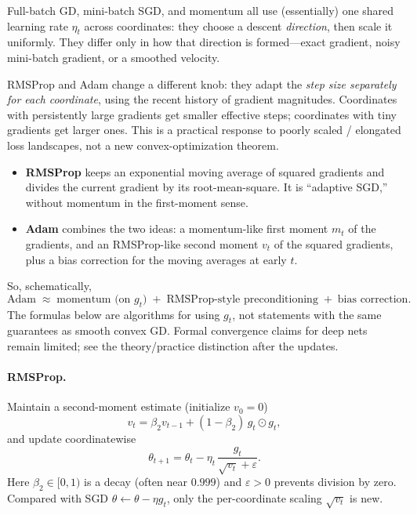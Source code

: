 \documentclass[11pt,a4paper]{article}
\theoremstyle{definition}
\begin{document}
\begin{note}
Full-batch GD, mini-batch SGD, and momentum all use (essentially) one shared learning rate $\eta_t$ across coordinates: they choose a descent \emph{direction}, then scale it uniformly. They differ only in how that direction is formed---exact gradient, noisy mini-batch gradient, or a smoothed velocity.

RMSProp and Adam change a different knob: they adapt the \emph{step size separately for each coordinate}, using the recent history of gradient magnitudes. Coordinates with persistently large gradients get smaller effective steps; coordinates with tiny gradients get larger ones. This is a practical response to poorly scaled / elongated loss landscapes, not a new convex-optimization theorem.

\begin{itemize}
  \item \textbf{RMSProp} keeps an exponential moving average of squared gradients and divides the current gradient by its root-mean-square. It is ``adaptive SGD,'' without momentum in the first-moment sense.
  \item \textbf{Adam} combines the two ideas: a momentum-like first moment $m_t$ of the gradients, and an RMSProp-like second moment $v_t$ of the squared gradients, plus a bias correction for the moving averages at early $t$.
\end{itemize}
So, schematically,
\[
\text{Adam}
\;\approx\;
\text{momentum (on }g_t\text{)}
\;+\;
\text{RMSProp-style preconditioning}
\;+\;
\text{bias correction.}
\]
The formulas below are algorithms for using $g_t$, not statements with the same guarantees as smooth convex GD. Formal convergence claims for deep nets remain limited; see the theory/practice distinction after the updates.
\end{note}

\paragraph*{RMSProp.}
Maintain a second-moment estimate (initialize $v_0=0$)
\[
v_t = \beta_2 v_{t-1} + (1-\beta_2)\, g_t\odot g_t,
\]
and update coordinatewise
\[
\theta_{t+1}
=
\theta_t - \eta_t\, \frac{g_t}{\sqrt{v_t}+\varepsilon}.
\]
Here $\beta_2\in[0,1)$ is a decay (often near $0.999$) and $\varepsilon>0$ prevents division by zero. Compared with SGD $\theta\leftarrow\theta-\eta g_t$, only the per-coordinate scaling $\sqrt{v_t}$ is new.
\end{document}
